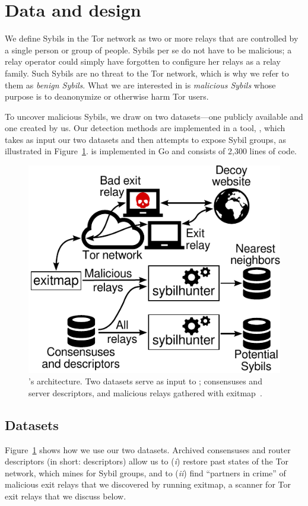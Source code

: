\section{Data and design}
\label{sec:design}
We define Sybils in the Tor network as two or more relays that are controlled by
a single person or group of people.  Sybils per se do not have to be malicious;
a relay operator could simply have forgotten to configure her relays as a relay
family.  Such Sybils are no threat to the Tor network, which is why we refer to
them as \emph{benign Sybils}.  What we are interested in is \emph{malicious
Sybils} whose purpose is to deanonymize or otherwise harm Tor users.

To uncover malicious Sybils, we draw on two datasets---one publicly available
and one created by us.  Our detection methods are implemented in a tool, \sys,
which takes as input our two datasets and then attempts to expose Sybil groups,
as illustrated in Figure~\ref{fig:system}.  \Sys is implemented in Go and
consists of 2,300 lines of code.

\begin{figure}[t]
	\centering
	\includegraphics[width=0.8\linewidth]{diagrams/architecture.pdf}
	\caption{\Sys's architecture.  Two datasets serve as input to
		\sys; consensuses and server descriptors, and malicious
		relays gathered with exitmap~\cite[\S~3.1]{Winter2014a}.}
	\label{fig:system}
\end{figure}

\subsection{Datasets}
\label{sec:datasets}
Figure~\ref{fig:system} shows how we use our two datasets.  Archived
consensuses and router descriptors (in short: descriptors) allow us to
(\emph{i}) restore past states of the Tor network, which \sys mines for Sybil
groups, and to (\emph{ii}) find ``partners in crime'' of malicious exit relays
that we discovered by running exitmap, a scanner for Tor exit relays that we
discuss below.

